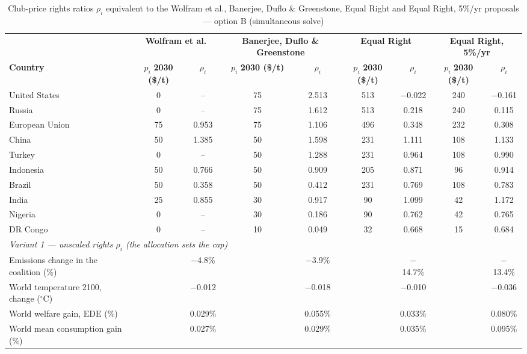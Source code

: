 \begin{table}[htbp]
\centering
\small
\caption{Club-price rights ratios $\rho_i$ equivalent to the Wolfram et al., Banerjee, Duflo \& Greenstone, Equal Right and Equal Right, 5\%/yr proposals --- option B (simultaneous solve)}
\renewcommand{\arraystretch}{1.15}
\begin{tabular}{lcccccccc}
  \toprule
  & \multicolumn{2}{c}{\textbf{Wolfram et al.}} & \multicolumn{2}{c}{\textbf{Banerjee, Duflo \& Greenstone}} & \multicolumn{2}{c}{\textbf{Equal Right}} & \multicolumn{2}{c}{\textbf{Equal Right, 5\%/yr}} \\
  \cmidrule(lr){2-3} \cmidrule(lr){4-5} \cmidrule(lr){6-7} \cmidrule(lr){8-9}
  \textbf{Country} & $p_i$ \textbf{2030 (\$/t)} & $\rho_i$ & $p_i$ \textbf{2030 (\$/t)} & $\rho_i$ & $p_i$ \textbf{2030 (\$/t)} & $\rho_i$ & $p_i$ \textbf{2030 (\$/t)} & $\rho_i$ \\
  \midrule
  United States & 0 & -- & 75 & 2.513 & 513 & $-$0.022 & 240 & $-$0.161 \\
  Russia & 0 & -- & 75 & 1.612 & 513 & 0.218 & 240 & 0.115 \\
  European Union & 75 & 0.953 & 75 & 1.106 & 496 & 0.348 & 232 & 0.308 \\
  China & 50 & 1.385 & 50 & 1.598 & 231 & 1.111 & 108 & 1.133 \\
  Turkey & 0 & -- & 50 & 1.288 & 231 & 0.964 & 108 & 0.990 \\
  Indonesia & 50 & 0.766 & 50 & 0.909 & 205 & 0.871 & 96 & 0.914 \\
  Brazil & 50 & 0.358 & 50 & 0.412 & 231 & 0.769 & 108 & 0.783 \\
  India & 25 & 0.855 & 30 & 0.917 & 90 & 1.099 & 42 & 1.172 \\
  Nigeria & 0 & -- & 30 & 0.186 & 90 & 0.762 & 42 & 0.765 \\
  DR Congo & 0 & -- & 10 & 0.049 & 32 & 0.668 & 15 & 0.684 \\
  \midrule
  \multicolumn{9}{l}{\textit{Variant 1 --- unscaled rights $\rho_i$ (the allocation sets the cap)}} \\
  \quad Emissions change in the coalition (\%) &  & $-$4.8\% &  & $-$3.9\% &  & $-$14.7\% &  & $-$13.4\% \\
  \quad World temperature 2100, change ($^\circ$C) &  & $-$0.012 &  & $-$0.018 &  & $-$0.010 &  & $-$0.036 \\
  \quad World welfare gain, EDE (\%) &  & 0.029\% &  & 0.055\% &  & 0.033\% &  & 0.080\% \\
  \quad World mean consumption gain (\%) &  & 0.027\% &  & 0.029\% &  & 0.035\% &  & 0.095\% \\

\end{tabular}
\end{table}
